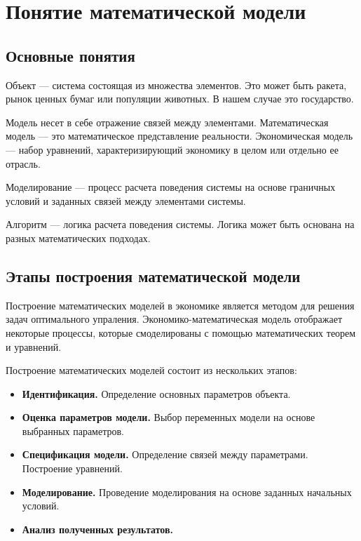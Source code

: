 \chapter{Понятие математической модели}
\label{cha:definition}

\section{Основные понятия}

Объект --- система состоящая из множества элементов.
Это может быть ракета, рынок ценных бумаг или популяции животных.
В нашем случае это государство.

Модель несет в себе отражение связей между элементами.
Математическая модель --- это математическое представление реальности.
Экономическая модель --- набор уравнений, характеризирующий экономику в целом или отдельно ее отрасль.

Моделирование --- процесс расчета поведения системы на основе граничных условий и заданных связей между элементами системы.

Алгоритм --- логика расчета поведения системы.
Логика может быть основана на разных математических подходах.

\section{Этапы построения математической модели}

Построение математических моделей в экономике является методом для решения задач оптимального упраления.
Экономико-математическая модель отображает некоторые процессы, которые смоделированы с помощью математических теорем и уравнений.

Построение математических моделей состоит из нескольких этапов:
\begin{itemize}
	\item \textbf{Идентификация.}
	Определение основных параметров объекта.
	\item \textbf{Оценка параметров модели.}
	Выбор переменных модели на основе выбранных параметров.
	\item \textbf{Спецификация модели.}
	Определение связей между параметрами.
	Построение уравнений.
	\item \textbf{Моделирование.}
	Проведение моделирования на основе заданных начальных условий.
	\item \textbf{Анализ полученных результатов.}
\end{itemize}

